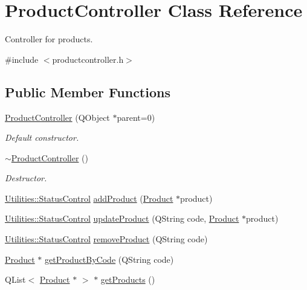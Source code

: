 \hypertarget{class_product_controller}{\section{\-Product\-Controller \-Class \-Reference}
\label{class_product_controller}
}


\-Controller for products.  




{\ttfamily \#include $<$productcontroller.\-h$>$}

\subsection*{\-Public \-Member \-Functions}
\begin{DoxyCompactItemize}
\item 
\hyperlink{class_product_controller_afbbd08808b23ebfaf2a092dd6203a6e6}{\-Product\-Controller} (\-Q\-Object $\ast$parent=0)
\begin{DoxyCompactList}\small\item\em \-Default constructor. \end{DoxyCompactList}\item 
\hyperlink{class_product_controller_ab13a58f05d7524e4a9ebed84358b73ec}{$\sim$\-Product\-Controller} ()
\begin{DoxyCompactList}\small\item\em \-Destructor. \end{DoxyCompactList}\item 
\hyperlink{class_utilities_a2974f062d85bdb0c444a1cbe554bf228}{\-Utilities\-::\-Status\-Control} \hyperlink{class_product_controller_a968c708fedcc864d107495aca8411524}{add\-Product} (\hyperlink{class_product}{\-Product} $\ast$product)
\item 
\hyperlink{class_utilities_a2974f062d85bdb0c444a1cbe554bf228}{\-Utilities\-::\-Status\-Control} \hyperlink{class_product_controller_adb44c0c5453aa299434127722b4e541c}{update\-Product} (\-Q\-String code, \hyperlink{class_product}{\-Product} $\ast$product)
\item 
\hyperlink{class_utilities_a2974f062d85bdb0c444a1cbe554bf228}{\-Utilities\-::\-Status\-Control} \hyperlink{class_product_controller_a69562c3d99232aa464c8edaf306bcb17}{remove\-Product} (\-Q\-String code)
\item 
\hyperlink{class_product}{\-Product} $\ast$ \hyperlink{class_product_controller_a9a5cf57b6d2590768acfe8644852c01c}{get\-Product\-By\-Code} (\-Q\-String code)
\item 
\-Q\-List$<$ \hyperlink{class_product}{\-Product} $\ast$ $>$ $\ast$ \hyperlink{class_product_controller_a0b4c79562600e749f16fbe8349a44ec5}{get\-Products} ()
\end{DoxyCompactItemize}


